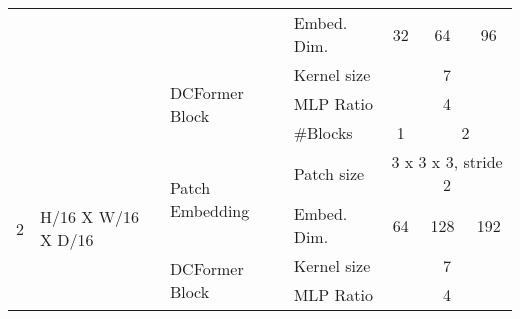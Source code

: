 \begin{table*}[t]
\begin{center}
\begin{tabular}{|llll|cccc|}
\multicolumn{1}{|l|}{}                       & \multicolumn{1}{l|}{}                                    & \multicolumn{1}{l|}{}                                    & Embed. Dim.                & \multicolumn{1}{c|}{32}    & \multicolumn{1}{c|}{64}    & \multicolumn{2}{c|}{96}            \\ \cline{3-8} 
\multicolumn{1}{|l|}{}                       & \multicolumn{1}{l|}{}                                    & \multicolumn{1}{l|}{\multirow{3}{*}{DCFormer Block}} & Kernel size                & \multicolumn{4}{c|}{7}                                                                       \\ \cline{4-8} 
\multicolumn{1}{|l|}{}                       & \multicolumn{1}{l|}{}                                    & \multicolumn{1}{l|}{}                                    & MLP Ratio                  & \multicolumn{4}{c|}{4}                                                                       \\ \cline{4-8} 
\multicolumn{1}{|l|}{}                       & \multicolumn{1}{l|}{}                                    & \multicolumn{1}{l|}{}                                    & \#Blocks                    & \multicolumn{1}{c|}{1}     & \multicolumn{3}{c|}{2}                                          \\ \hline
\multicolumn{1}{|l|}{\multirow{5}{*}{2}}     & \multicolumn{1}{l|}{\multirow{5}{*}{H/16 X W/16 X D/16}} & \multicolumn{1}{l|}{\multirow{2}{*}{Patch Embedding}}    & Patch size                 & \multicolumn{4}{c|}{3 x 3 x 3, stride 2}                                                     \\ \cline{4-8} 
\multicolumn{1}{|l|}{}                       & \multicolumn{1}{l|}{}                                    & \multicolumn{1}{l|}{}                                    & Embed. Dim.                & \multicolumn{1}{c|}{64}    & \multicolumn{1}{c|}{128}   & \multicolumn{2}{c|}{192}           \\ \cline{3-8} 
\multicolumn{1}{|l|}{}                       & \multicolumn{1}{l|}{}                                    & \multicolumn{1}{l|}{\multirow{3}{*}{DCFormer Block}} & Kernel size                & \multicolumn{4}{c|}{7}                                                                       \\ \cline{4-8} 
\multicolumn{1}{|l|}{}                       & \multicolumn{1}{l|}{}                                    & \multicolumn{1}{l|}{}                                    & MLP Ratio                  & \multicolumn{4}{c|}{4}                                                                       \\ \cline{4-8} 

\end{tabular}
\end{center}
\end{table*}
